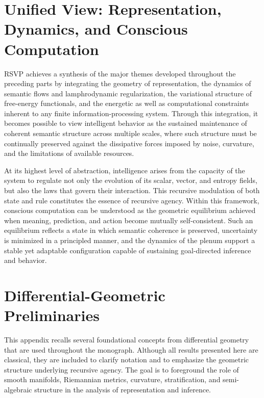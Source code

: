 \documentclass[12pt]{article}
\theoremstyle{plain}
\theoremstyle{definition}
\theoremstyle{remark}
\begin{document}
\section{Unified View: Representation, Dynamics, and Conscious Computation}

RSVP achieves a synthesis of the major themes developed throughout the preceding parts by integrating the geometry of representation, the dynamics of semantic flows and lamphrodynamic regularization, the variational structure of free-energy functionals, and the energetic as well as computational constraints inherent to any finite information-processing system. Through this integration, it becomes possible to view intelligent behavior as the sustained maintenance of coherent semantic structure across multiple scales, where such structure must be continually preserved against the dissipative forces imposed by noise, curvature, and the limitations of available resources. 

At its highest level of abstraction, intelligence arises from the capacity of the system to regulate not only the evolution of its scalar, vector, and entropy fields, but also the laws that govern their interaction. This recursive modulation of both state and rule constitutes the essence of recursive agency. Within this framework, conscious computation can be understood as the geometric equilibrium achieved when meaning, prediction, and action become mutually self-consistent. Such an equilibrium reflects a state in which semantic coherence is preserved, uncertainty is minimized in a principled manner, and the dynamics of the plenum support a stable yet adaptable configuration capable of sustaining goal-directed inference and behavior.

\newpage

\appendix

\section{Differential-Geometric Preliminaries}
\label{app:differential-geometry}

This appendix recalls several foundational concepts from differential geometry that are used throughout the monograph. Although all results presented here are classical, they are included to clarify notation and to emphasize the geometric structure underlying recursive agency. The goal is to foreground the role of smooth manifolds, Riemannian metrics, curvature, stratification, and semi-algebraic structure in the analysis of representation and inference.
\end{document}
